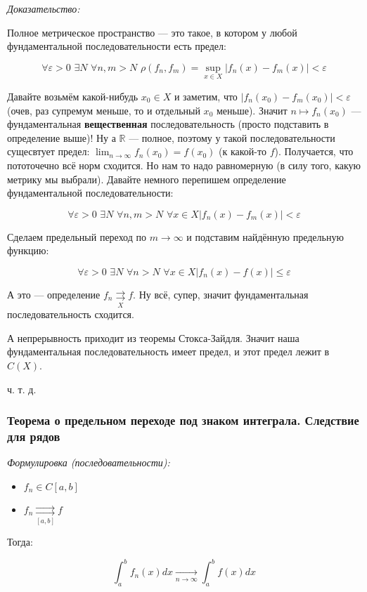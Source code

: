 \documentclass{article}
\def\dbl{\,\,}
\def\rsh#1{\underset{#1}{\rightrightarrows}}
\begin{document}
\textit{Доказательство:}

Полное метрическое пространство --- это такое, в котором у любой фундаментальной последовательности есть предел:

\[\forall \varepsilon > 0 \dbl \exists N \dbl \forall n, m > N \dbl \rho(f_n, f_m) = \sup_{x \in X}|f_n(x) - f_m(x)| < \varepsilon\]

Давайте возьмём какой-нибудь $x_0 \in X$ и заметим, что $|f_n(x_0) - f_m(x_0)| < \varepsilon$ (очев, раз супремум меньше, то и отдельный $x_0$ меньше). Значит $n \mapsto f_n(x_0)$ --- фундаментальная \textbf{вещественная} последовательность (просто подставить в определение выше)! Ну а $\mathbb{R}$ --- полное, поэтому у такой последовательности сущесвтует предел: $\lim_{n \rightarrow \infty} f_n(x_0) = f(x_0)$ (к какой-то $f$). Получается, что пототочечно всё норм сходится. Но нам то надо равномерную (в силу того, какую метрику мы выбрали). Давайте немного перепишем определение фундаментальной последовательности:

\[\forall \varepsilon > 0 \dbl \exists N \dbl \forall n, m > N \dbl \forall x \in X |f_n(x) - f_m(x)| < \varepsilon\]

Сделаем предельный переход по $m \rightarrow \infty$ и подставим найдённую предельную функцию: 

\[\forall \varepsilon > 0 \dbl \exists N \dbl \forall n > N \dbl \forall x \in X |f_n(x) - f(x)| \le \varepsilon\]

А это --- определение $f_n \rsh{X} f$. Ну всё, супер, значит фундаментальная последовательность сходится.

А непрерывность приходит из теоремы Стокса-Зайдля. Значит наша фундаментальная последовательность имеет предел, и этот предел лежит в $C(X)$.

ч. т. д. 

\subsubsection{Теорема о предельном переходе под знаком интеграла. Следствие для рядов}
\textit{Формулировка (последовательности):}

\begin{itemize}
    \item $f_n \in C[a, b]$
    \item $f_n \rsh{[a, b]} f$
\end{itemize}

Тогда:

\[\int_a^b{f_n(x)dx} \underset{n \rightarrow \infty}{\longrightarrow} \int_a^b{f(x)dx}\]
\end{document}
